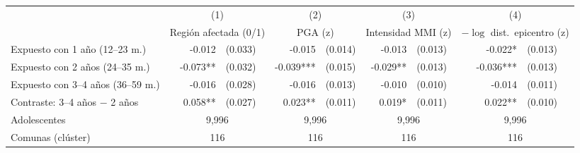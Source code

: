 \begin{tabular}{l rl rl rl rl}
\toprule
 & \multicolumn{2}{c}{(1)} & \multicolumn{2}{c}{(2)} & \multicolumn{2}{c}{(3)} & \multicolumn{2}{c}{(4)} \\
 & \multicolumn{2}{c}{Regi\'on afectada (0/1)} & \multicolumn{2}{c}{PGA (z)} & \multicolumn{2}{c}{Intensidad MMI (z)} & \multicolumn{2}{c}{$-\log$ dist.\ epicentro (z)} \\
\midrule
Expuesto con 1 a\~no (12--23 m.) & -0.012 & (0.033) & -0.015 & (0.014) & -0.013 & (0.013) & -0.022* & (0.013) \\
Expuesto con 2 a\~nos (24--35 m.) & -0.073** & (0.032) & -0.039*** & (0.015) & -0.029** & (0.013) & -0.036*** & (0.013) \\
Expuesto con 3--4 a\~nos (36--59 m.) & -0.016 & (0.028) & -0.016 & (0.013) & -0.010 & (0.010) & -0.014 & (0.011) \\
\addlinespace
Contraste: 3--4 a\~nos $-$ 2 a\~nos & 0.058** & (0.027) & 0.023** & (0.011) & 0.019* & (0.011) & 0.022** & (0.010) \\
\midrule
Adolescentes & \multicolumn{2}{c}{9,996} & \multicolumn{2}{c}{9,996} & \multicolumn{2}{c}{9,996} & \multicolumn{2}{c}{9,996} \\
Comunas (cl\'uster) & \multicolumn{2}{c}{116} & \multicolumn{2}{c}{116} & \multicolumn{2}{c}{116} & \multicolumn{2}{c}{116} \\
\bottomrule
\end{tabular}
